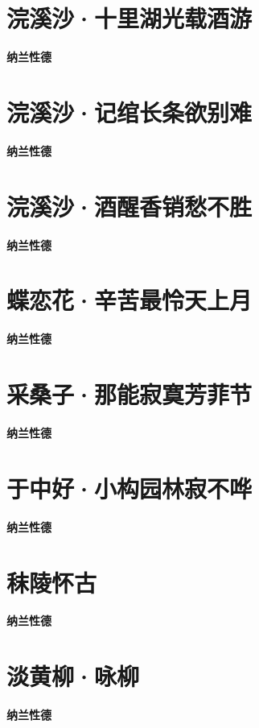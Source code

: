 \documentclass[12pt,a4paper]{ctexbook}
\begin{document}
\section{浣溪沙·十里湖光载酒游}
\textbf{纳兰性德}\par\vspace{0.5em}

\section{浣溪沙·记绾长条欲别难}
\textbf{纳兰性德}\par\vspace{0.5em}

\section{浣溪沙·酒醒香销愁不胜}
\textbf{纳兰性德}\par\vspace{0.5em}

\section{蝶恋花·辛苦最怜天上月}
\textbf{纳兰性德}\par\vspace{0.5em}

\section{采桑子·那能寂寞芳菲节}
\textbf{纳兰性德}\par\vspace{0.5em}

\section{于中好·小构园林寂不哗}
\textbf{纳兰性德}\par\vspace{0.5em}

\section{秣陵怀古}
\textbf{纳兰性德}\par\vspace{0.5em}

\section{淡黄柳·咏柳}
\textbf{纳兰性德}\par\vspace{0.5em}
\end{document}
